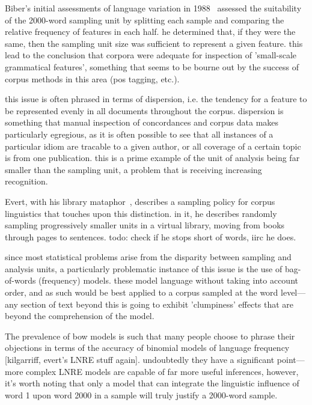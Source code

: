 Biber's initial assessments of language variation in 1988~\cite{biber1988variation} assessed the suitability of the 2000-word sampling unit by splitting each sample and comparing the relative frequency of features in each half.  he determined that, if they were the same, then the sampling unit size was sufficient to represent a given feature.  this lead to the conclusion that corpora were adequate for inspection of 'small-scale grammatical features', something that seems to be bourne out by the success of corpus methods in this area (pos tagging, etc.).

this issue is often phrased in terms of dispersion, i.e. the tendency for a feature to be represented evenly in all documents throughout the corpus.  dispersion is something that manual inspection of concordances and corpus data makes particularly egregious, as it is often possible to see that all instances of a particular idiom are tracable to a given author, or all coverage of a certain topic is from one publication.  this is a prime example of the unit of analysis being far smaller than the sampling unit, a problem that is receiving increasing recognition.

Evert, with his library mataphor~\cite{evert2006random}, describes a sampling policy for corpus linguistics that touches upon this distinction.  in it, he describes randomly sampling progressively smaller units in a virtual library, moving from books through pages to sentences.  todo: check if he stops short of words, iirc he does.

since most statistical problems arise from the disparity between sampling and analysis units, a particularly problematic instance of this issue is the use of bag-of-words (frequency) models.  these model language without taking into account order, and as such would be best applied to a corpus sampled at the word level---any section of text beyond this is going to exhibit 'clumpiness' effects that are beyond the comprehension of the model.

The prevalence of bow models is such that many people choose to phrase their objections in terms of the accuracy of binomial models of language frequency [kilgarriff, evert's LNRE stuff again]\cite{evert2004simple}\cite{evert2007zipfr}.  undoubtedly they have a significant point---more complex LNRE models are capable of far more useful inferences, however, it's worth noting that only a model that can integrate the linguistic influence of word 1 upon word 2000 in a sample will truly justify a 2000-word sample.

